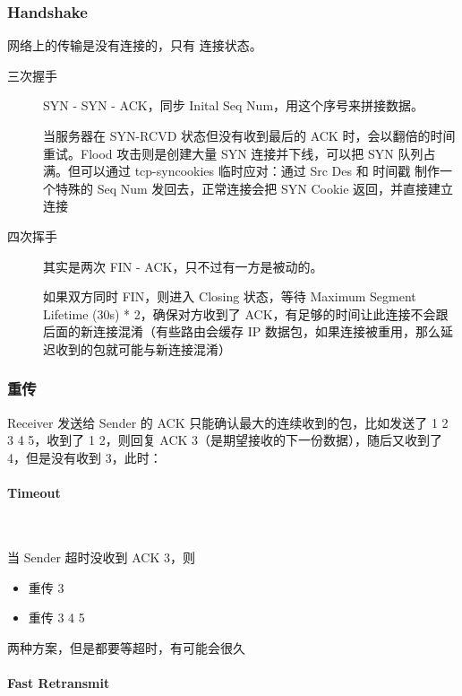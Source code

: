 \documentclass[11pt,journal,compsoc]{IEEEtran}
\begin{document}
\subsubsection{Handshake}

网络上的传输是没有连接的，只有 连接状态。

\begin{description}
    \item[三次握手] SYN - SYN - ACK，同步 Inital Seq Num，用这个序号来拼接数据。

    当服务器在 SYN-RCVD 状态但没有收到最后的 ACK 时，会以翻倍的时间重试。Flood 攻击则是创建大量 SYN 连接并下线，可以把 SYN 队列占满。但可以通过 tcp-syncookies 临时应对：通过 Src Des 和 时间戳 制作一个特殊的 Seq Num 发回去，正常连接会把 SYN Cookie 返回，并直接建立连接

    \item[四次挥手] 其实是两次 FIN - ACK，只不过有一方是被动的。
    
    如果双方同时 FIN，则进入 Closing 状态，等待 Maximum Segment Lifetime (30s) * 2，确保对方收到了 ACK，有足够的时间让此连接不会跟后面的新连接混淆（有些路由会缓存 IP 数据包，如果连接被重用，那么延迟收到的包就可能与新连接混淆）
\end{description}


\subsubsection{重传}

Receiver 发送给 Sender 的 ACK 只能确认最大的连续收到的包，比如发送了 1 2 3 4 5，收到了 1 2，则回复 ACK 3（是期望接收的下一份数据），随后又收到了 4，但是没有收到 3，此时：

\paragraph{Timeout} ~

当 Sender 超时没收到 ACK 3，则

\begin{itemize}
    \item 重传 3
    \item 重传 3 4 5
\end{itemize}

两种方案，但是都要等超时，有可能会很久

\paragraph{Fast Retransmit} ~
\end{document}
